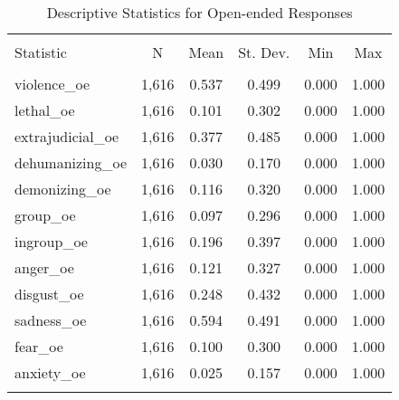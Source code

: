 
\begin{table}[H] \centering 
  \caption{Descriptive Statistics for Open-ended Responses} 
  \label{} 
\begin{tabular}{@{\extracolsep{5pt}}lccccc} 
\\[-1.8ex]\hline 
\hline \\[-1.8ex] 
Statistic & \multicolumn{1}{c}{N} & \multicolumn{1}{c}{Mean} & \multicolumn{1}{c}{St. Dev.} & \multicolumn{1}{c}{Min} & \multicolumn{1}{c}{Max} \\ 
\hline \\[-1.8ex] 
violence\_oe & 1,616 & 0.537 & 0.499 & 0.000 & 1.000 \\ 
lethal\_oe & 1,616 & 0.101 & 0.302 & 0.000 & 1.000 \\ 
extrajudicial\_oe & 1,616 & 0.377 & 0.485 & 0.000 & 1.000 \\ 
dehumanizing\_oe & 1,616 & 0.030 & 0.170 & 0.000 & 1.000 \\ 
demonizing\_oe & 1,616 & 0.116 & 0.320 & 0.000 & 1.000 \\ 
group\_oe & 1,616 & 0.097 & 0.296 & 0.000 & 1.000 \\ 
ingroup\_oe & 1,616 & 0.196 & 0.397 & 0.000 & 1.000 \\ 
anger\_oe & 1,616 & 0.121 & 0.327 & 0.000 & 1.000 \\ 
disgust\_oe & 1,616 & 0.248 & 0.432 & 0.000 & 1.000 \\ 
sadness\_oe & 1,616 & 0.594 & 0.491 & 0.000 & 1.000 \\ 
fear\_oe & 1,616 & 0.100 & 0.300 & 0.000 & 1.000 \\ 
anxiety\_oe & 1,616 & 0.025 & 0.157 & 0.000 & 1.000 \\ 
\hline \\[-1.8ex] 
\end{tabular} 
\end{table} 
